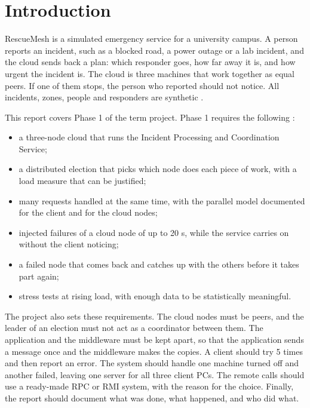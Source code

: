 \section{Introduction}
\label{sec:intro}

RescueMesh is a simulated emergency service for a university campus. A person reports an incident, such as a blocked road, a power outage or a lab incident, and the cloud sends back a plan: which responder goes, how far away it is, and how urgent the incident is. The cloud is three machines that work together as equal peers. If one of them stops, the person who reported should not notice. All incidents, zones, people and responders are synthetic \cite{spec}.

This report covers Phase 1 of the term project. Phase 1 requires the following \cite{spec}:

\begin{itemize}
  \item a three-node cloud that runs the Incident Processing and Coordination Service;
  \item a distributed election that picks which node does each piece of work, with a load measure that can be justified;
  \item many requests handled at the same time, with the parallel model documented for the client and for the cloud nodes;
  \item injected failures of a cloud node of up to 20 s, while the service carries on without the client noticing;
  \item a failed node that comes back and catches up with the others before it takes part again;
  \item stress tests at rising load, with enough data to be statistically meaningful.
\end{itemize}

The project also sets these requirements. The cloud nodes must be peers, and the leader of an election must not act as a coordinator between them. The application and the middleware must be kept apart, so that the application sends a message once and the middleware makes the copies. A client should try 5 times and then report an error. The system should handle one machine turned off and another failed, leaving one server for all three client PCs. The remote calls should use a ready-made RPC or RMI system, with the reason for the choice. Finally, the report should document what was done, what happened, and who did what.

